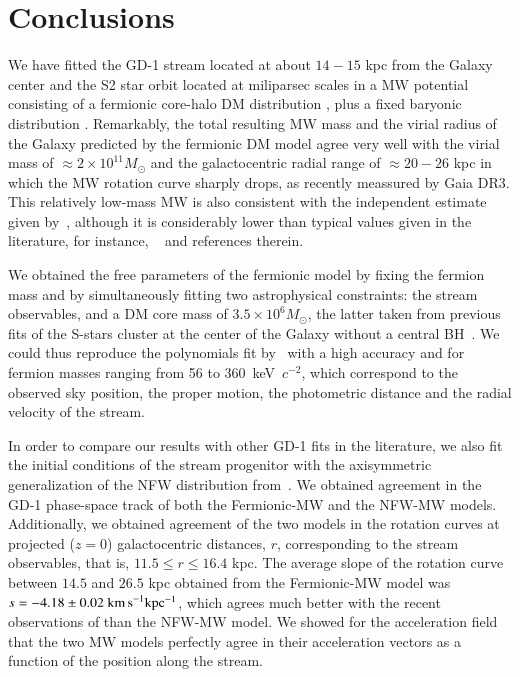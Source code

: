 \documentclass[twocolumn]{aa}
\begin{document}
\section{Conclusions}
\label{sec:conclusions}
We have fitted the GD-1 stream located at about $14-15$ kpc from the Galaxy center and the S2 star orbit located at miliparsec scales in a MW potential consisting of a fermionic core-halo DM distribution
\citep{arguelles_novel_2018,2020A&A...641A..34B,2021MNRAS.505L..64B,2022MNRAS.511L..35A}, plus a fixed baryonic distribution \citep{2017A&A...598A..66P}. Remarkably, the total resulting MW mass and the virial radius of the Galaxy predicted by the fermionic DM model agree very well with the virial mass of $\approx 2\times 10^{11} M_\odot$ and the galactocentric radial range of $\approx 20-26$ kpc in which the MW rotation curve sharply drops, as recently meassured by Gaia DR3. This relatively low-mass MW is also consistent with the independent estimate given by~\cite{2014MNRAS.445.3788G}, although it is considerably lower than typical values given in the literature, for instance, ~\cite{2010MNRAS.406..264W} and references therein.

We obtained the free parameters of the fermionic model by fixing the fermion mass and by simultaneously fitting two astrophysical constraints: the stream observables, and a
DM core mass of $3.5\times10^6M_\odot$, the latter taken from previous fits of the S-stars cluster at
the center of the Galaxy without a central BH~\citep{2020A&A...641A..34B,2021MNRAS.505L..64B}. We could thus reproduce the polynomials fit by~\citet{Ibata_2020} with a high accuracy and for fermion masses ranging from 56 to 360~keV~$c^{-2}$, which correspond to the observed sky position, the proper motion, the photometric distance and the radial velocity of the stream.

In order to compare our results with other GD-1 fits in the literature, we also fit the initial conditions of the stream progenitor with the  axisymmetric generalization of the NFW distribution from~\citet{2019MNRAS.486.2995M}. We obtained agreement in the GD-1 phase-space track of
both the Fermionic-MW and the NFW-MW models. Additionally, we obtained agreement of the two models in the rotation curves at projected ($z=0$) galactocentric distances, $r$, corresponding to the stream observables, that is, $11.5\leq r \leq 16.4$ kpc. The average slope of the rotation curve between $14.5$ and $26.5$ kpc obtained from the Fermionic-MW model was $s=-4.18 \pm 0.02~\rm{km\, s}^{-1} kpc^{-1}$, which agrees much better with the recent observations of \cite{Jiao2023} than the NFW-MW model. We showed for the acceleration field that the two MW models perfectly agree in their acceleration vectors as a function of the position along the stream.
\end{document}
